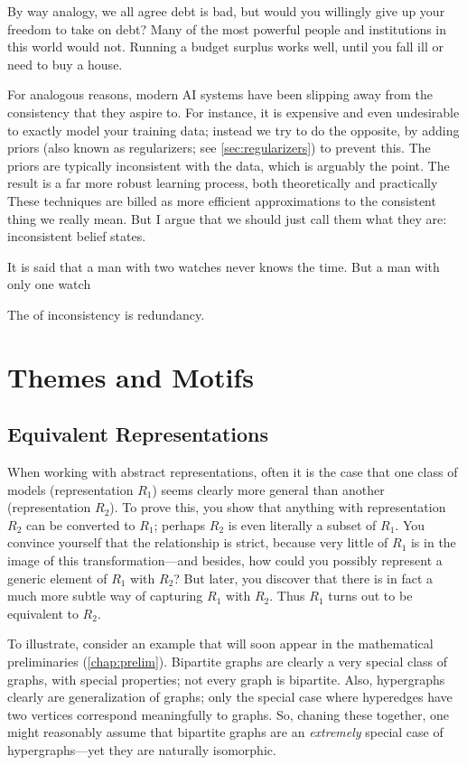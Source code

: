 By way analogy, we all agree debt is bad, but would you willingly give up your freedom to take on debt?
Many of the most powerful people and institutions in this world would not.
Running a budget surplus works well, until you fall ill or need to buy a house.

For analogous reasons, modern AI systems have been slipping away from the consistency that they aspire to.
For instance, it is expensive and even undesirable to exactly model your training data; instead we try to do the opposite, by adding priors (also known as regularizers; see \cref{sec:regularizers}) to prevent this.
The priors are typically inconsistent with the data, which is arguably the point.
The result is a far more robust learning process, both theoretically \cite{ftrl} and practically \cite{regularizers}
%
%
These techniques are billed as more efficient approximations to the consistent thing we really mean.
But I argue that we should just call them what they are: inconsistent belief states.


It is said that a man with two watches never knows the time.  But a man with only one watch

The  of inconsistency is redundancy.




\section{Themes and Motifs}

\subsection{Equivalent Representations}

When working with abstract representations, often it is the case that one class of models (representation $R_1$) seems clearly more general than another (representation $R_2$).
To prove this, you show that anything with representation $R_2$ can be converted to $R_1$; perhaps $R_2$ is even literally a subset of $R_1$. 
You convince yourself that the relationship is strict, because very little of $R_1$ is in the image of this transformation---and besides, how could you possibly represent a generic element of $R_1$ with $R_2$? 
But later, you discover that there is in fact a much more subtle way of capturing $R_1$ with $R_2$. 
Thus $R_1$ turns out to be equivalent to $R_2$. 

To illustrate, consider an example that will soon appear in the mathematical preliminaries (\cref{chap:prelim}). 
Bipartite graphs are clearly a very special class of graphs, with special properties; not every graph is bipartite. 
Also, hypergraphs clearly are generalization of graphs; only the special case where hyperedges have two vertices correspond meaningfully to graphs. 
So, chaning these together, one might reasonably assume that bipartite graphs are an \emph{extremely} special case of hypergraphs---yet they are naturally isomorphic. 


